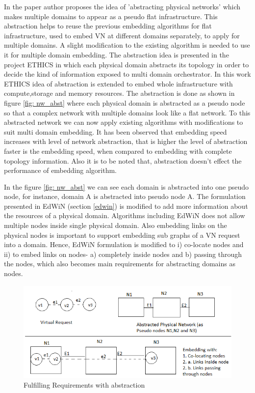 \documentclass[article,dr=phil,type=msc ,colorback,accentcolor=tud4b]{tudthesis}
\begin{document}
In the paper \cite{multi-domain} author proposes the idea of 'abstracting physical networks' which makes multiple domains to appear as a pseudo flat infrastructure. This abstraction helps to reuse the previous embedding algorithms for flat infrastructure, used to embed VN at different domains separately, to apply for multiple domains. A slight modification to the existing algorithm is needed to use it for multiple domain embedding. The abstraction idea is presented in the project ETHICS \cite{EHTICS} in which each physical domain abstracts its topology in order to decide the kind of information exposed to multi domain orchestrator. In this work \cite{multi-domain} ETHICS idea of abstraction is extended to embed whole infrastructure with compute,storage and memory resources. The abstraction is done as shown in figure \ref{fig: nw_abst} where each physical domain is abstracted as a pseudo node so that a complex network with multiple domains look like a flat network. To this abstracted network we can now apply existing algorithms with modifications to suit multi domain embedding. It has been observed that embedding speed increases with level of network abstraction, that is higher the level of abstraction faster is the embedding speed, when compared to embedding with complete topology information. Also it is to be noted that, abstraction doesn't effect the performance of embedding algorithm.

In the figure \ref{fig: nw_abst} we can see each domain is abstracted into one pseudo node, for instance, domain A is abstracted into pseudo node A. The formulation presented in EdWiN (section \ref{edwin}) is modified to add more information about the resources of a physical domain. Algorithms including EdWiN does not allow multiple nodes inside single physical domain. Also embedding links on the physical nodes is important to support embedding sub graphs of a VN request into a domain. Hence, EdWiN formulation is modified to i) co-locate nodes and ii) to embed links on nodes- a) completely inside nodes and b) passing through the nodes, which also becomes main requirements for abstracting domains as nodes.\newline

\begin{figure}[h]
	\centering
	\includegraphics[width=14cm, height=5cm]{modify.jpg}
	\caption{Fulfilling Requirements with abstraction}
	\label{fig: modify}
\end{figure}
\end{document}
